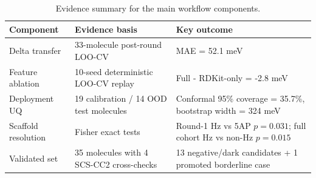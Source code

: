 \begin{table}[htbp]
\centering
\caption{Evidence summary for the main workflow components.}
\label{tab:method_summary}
\small
\begin{tabular}{lll}
\toprule
Component & Evidence basis & Key outcome \\
\midrule
Delta transfer & 33-molecule post-round LOO-CV & MAE = 52.1 meV \\
Feature ablation & 10-seed deterministic LOO-CV replay & Full - RDKit-only = -2.8 meV \\
Deployment UQ & 19 calibration / 14 OOD test molecules & Conformal 95\% coverage = 35.7\%, bootstrap width = 324 meV \\
Scaffold resolution & Fisher exact tests & Round-1 Hz vs 5AP $p = 0.031$; full cohort Hz vs non-Hz $p = 0.015$ \\
Validated set & 35 molecules with 4 SCS-CC2 cross-checks & 13 negative/dark candidates + 1 promoted borderline case \\
\bottomrule
\end{tabular}
\end{table}